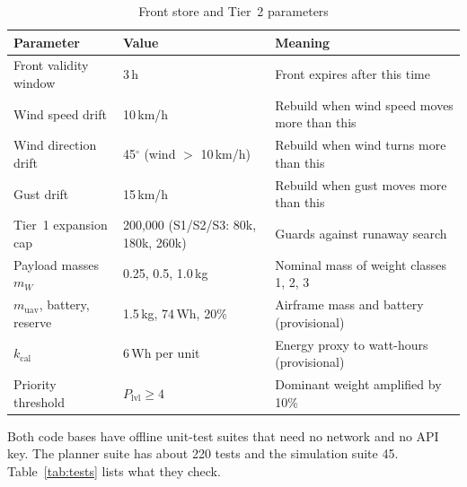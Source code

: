 \begin{table}[!htbp]
\centering
\caption{Front store and Tier~2 parameters}\label{tab:params2}
\small
\begin{tabular}{|P{5.0cm}|P{3.4cm}|P{5.8cm}|}
\hline
\textbf{Parameter} & \textbf{Value} & \textbf{Meaning}\\
\hline
Front validity window & 3\,h & Front expires after this time\\
\hline
Wind speed drift & 10\,km/h & Rebuild when wind speed moves more than this\\
\hline
Wind direction drift & 45$^\circ$ (wind $>$ 10\,km/h) & Rebuild when wind turns more than this\\
\hline
Gust drift & 15\,km/h & Rebuild when gust moves more than this\\
\hline
Tier~1 expansion cap & 200,000 (S1/S2/S3: 80k, 180k, 260k) & Guards against runaway search\\
\hline
Payload masses $m_W$ & 0.25, 0.5, 1.0\,kg & Nominal mass of weight classes 1, 2, 3\\
\hline
$m_\mathrm{uav}$, battery, reserve & 1.5\,kg, 74\,Wh, 20\% & Airframe mass and battery (provisional)\\
\hline
$k_\mathrm{cal}$ & 6\,Wh per unit & Energy proxy to watt-hours (provisional)\\
\hline
Priority threshold & $P_\mathrm{lvl} \geq 4$ & Dominant weight amplified by 10\%\\
\hline
\end{tabular}
\end{table}

\FloatBarrier
{}\label{app:tests}

Both code bases have offline unit-test suites that need no network and no API key.
The planner suite has about 220 tests and the simulation suite 45.
Table~\ref{tab:tests} lists what they check.

